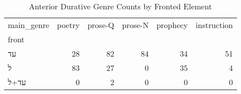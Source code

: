 \begin{table}[htbp!]
\centering
\caption{Anterior Durative Genre Counts by Fronted Element}
\label{table:antdur_gen_ct}
\begin{tabular}{lrrrrr}
\toprule
main\_genre &  poetry &  prose-Q &  prose-N &  prophecy &  instruction \\
front &         &          &          &           &              \\
\midrule
עד    &      28 &       82 &       84 &        34 &           51 \\
ל     &      83 &       27 &        0 &        35 &            4 \\
עד+ל  &       0 &        2 &        0 &         0 &            0 \\
\bottomrule
\end{tabular}
\end{table}
